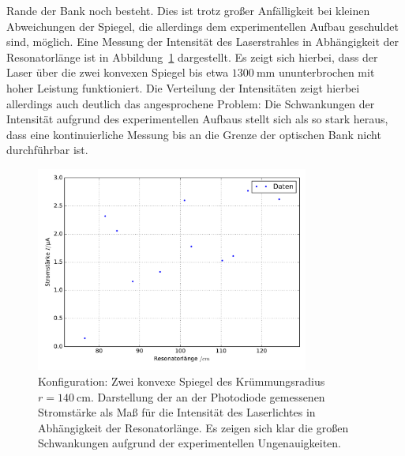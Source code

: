 Rande der Bank noch besteht. Dies ist trotz großer Anfälligkeit bei kleinen Abweichungen der Spiegel, die allerdings dem experimentellen Aufbau
geschuldet sind, möglich. Eine Messung der Intensität des Laserstrahles in Abhängigkeit der Resonatorlänge ist in Abbildung~\ref{fig:kk}
dargestellt. Es zeigt sich hierbei, dass der Laser über die zwei konvexen Spiegel bis etwa $\SI{1300}{\milli\meter}$ ununterbrochen mit hoher Leistung funktioniert.
Die Verteilung der Intensitäten zeigt hierbei allerdings auch deutlich das angesprochene Problem: Die Schwankungen der Intensität aufgrund
des experimentellen Aufbaus stellt sich als so stark heraus, dass eine kontinuierliche Messung bis an die Grenze der optischen Bank nicht
durchführbar ist.
%
\begin{figure}[htb]
  \centering
  \includegraphics[width=0.8\textwidth]{auswertung/plot_kk.pdf}
  \caption{Konfiguration: Zwei konvexe Spiegel des Krümmungsradius $r=\SI{140}{\centi\meter}$. Darstellung der an der Photodiode gemessenen Stromstärke als Maß für die Intensität des Laserlichtes in Abhängigkeit der Resonatorlänge. Es zeigen sich klar die großen Schwankungen aufgrund der experimentellen Ungenauigkeiten.}
  \label{fig:kk}
\end{figure}
%
